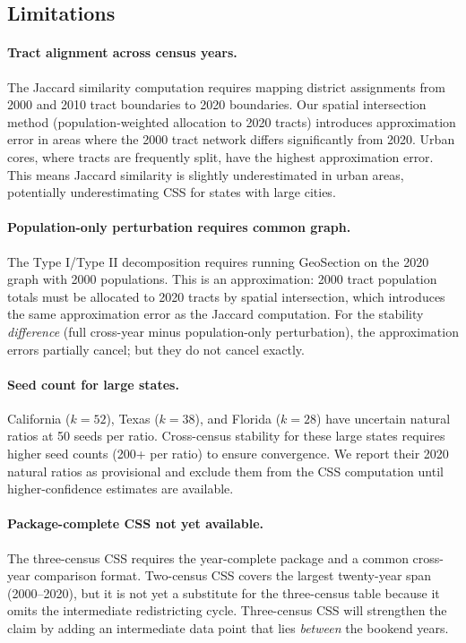 \subsection{Limitations}

\paragraph{Tract alignment across census years.}
The Jaccard similarity computation requires mapping district assignments from
2000 and 2010 tract boundaries to 2020 boundaries.
Our spatial intersection method (population-weighted allocation to 2020 tracts)
introduces approximation error in areas where the 2000 tract network differs
significantly from 2020.
Urban cores, where tracts are frequently split, have the highest
approximation error.
This means Jaccard similarity is slightly underestimated in urban areas,
potentially underestimating CSS for states with large cities.

\paragraph{Population-only perturbation requires common graph.}
The Type I/Type II decomposition requires running GeoSection on the 2020
graph with 2000 populations.
This is an approximation: 2000 tract population totals must be allocated to
2020 tracts by spatial intersection, which introduces the same approximation
error as the Jaccard computation.
For the stability \emph{difference} (full cross-year minus population-only
perturbation), the approximation errors partially cancel; but they do not
cancel exactly.

\paragraph{Seed count for large states.}
California ($k=52$), Texas ($k=38$), and Florida ($k=28$) have uncertain
natural ratios at 50 seeds per ratio.
Cross-census stability for these large states requires higher seed counts
(200+ per ratio) to ensure convergence.
We report their 2020 natural ratios as provisional and exclude them from the
CSS computation until higher-confidence estimates are available.

\paragraph{Package-complete CSS not yet available.}
The three-census CSS requires the year-complete package and a common cross-year
comparison format.
Two-census CSS covers the largest twenty-year span (2000--2020), but it is not
yet a substitute for the three-census table because it omits the intermediate
redistricting cycle.
Three-census CSS will strengthen the claim by adding an intermediate
data point that lies \emph{between} the bookend years.

